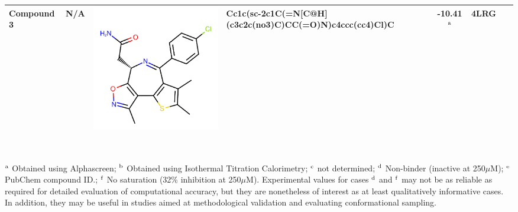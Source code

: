 \documentclass[aps,pre,twocolumn,nofootinbib,superscriptaddress,10pt, final,tightenlines]{revtex4-1}
\begin{document}
\begin{table}
\begin{center}
\begin{tabular}{llp{2cm}>{\ttfamily}lS[table-format=-1.2, table-figures-uncertainty=1]ll}
Compound 3                  & N/A                                    & \parbox[c]{1em}{\includegraphics[scale=0.15]{figures/new-bromo/C-3.pdf}}      & Cc1c(sc-2c1C(=N[C@H](c3c2c(no3)C)CC(=O)N)c4ccc(cc4)Cl)C          & -10.41$^{\rm a}$                              & 4LRG~\cite{Gehling:2013:ACSMed.Chem.Lett.} & \cite{Gehling:2013:ACSMed.Chem.Lett.}   \\ 
\bottomrule
\end{tabular}                                                                                                                                                                                                                                                                                                       \\
\end{center}
$^{\rm a}$ Obtained using Alphascreen; $^{\rm b}$ Obtained using Isothermal Titration Calorimetry; $^{\rm c}$ not determined; $^{\rm d}$ Non-binder (inactive at 250$\mu$M); $^{\rm e}$ PubChem compound ID.; $^{\rm f}$ No saturation (32\% inhibition at 250$\mu$M). 
Experimental values for cases $^{\rm d}$ and $^{\rm f}$ may not be as reliable as required for detailed evaluation of computational accuracy, but they are nonetheless of interest as at least qualitatively informative cases. In addition, they may be useful in studies aimed at methodological validation and evaluating conformational sampling. 
\end{table}
\endgroup
\end{document}
